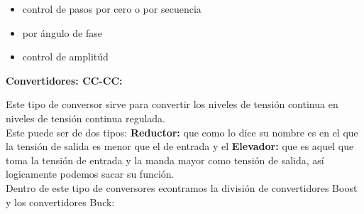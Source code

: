 \documentclass[a3paper,12pt]{article}
\begin{document}
{\begin{flushleft}
\begin{LARGE}
	\begin{itemize}
	\item control de pasos por cero o por secuencia
	\item por ángulo de fase 
	\item control de amplitúd
	
	\end{itemize}
\end{LARGE}
\vspace{1cm}




















{\color{cyan}\huge{\textbf{Convertidores: CC-CC:}}}\\
\begin{LARGE}
Este tipo de conversor sirve para convertir los niveles de tensión continua en niveles de tensión continua regulada.\\
Este puede ser de dos tipos: \textbf{Reductor:} que como lo dice su nombre es en el que la tensión de salida es menor que el de entrada y el \textbf{Elevador:} que es aquel que toma la tensión de entrada y la manda mayor como tensión de salida, así logicamente podemos sacar su función.\\	

Dentro de este tipo de conversores econtramos la división de convertidores Boost y los convertidores Buck:\\


\end{LARGE}
\end{flushleft}}
\end{document}
